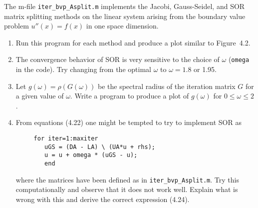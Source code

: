 

The m-file \verb+iter_bvp_Asplit.m+ implements the Jacobi, Gauss-Seidel, and
SOR matrix splitting methods on the linear system arising from the boundary
value problem $u''(x) = f(x)$ in one space dimension.  

\begin{enumerate}
\item Run this program for each method and produce a plot similar to 
Figure~4.2.

\item The convergence behavior of SOR is very sensitive to the choice of
$\omega$ ({\tt omega} in the code).  Try changing from the optimal $\omega$
to $\omega = 1.8$ or 1.95.

\item Let $g(\omega) = \rho(G(\omega))$ be the spectral radius of the
iteration matrix $G$ for a given value of $\omega$.  Write a program to
produce a plot of $g(\omega)$ for $0\leq \omega \leq 2$.

\item From equations (4.22) one might be tempted to try to implement SOR as
\begin{verbatim}
     for iter=1:maxiter
        uGS = (DA - LA) \ (UA*u + rhs);
        u = u + omega * (uGS - u);
        end
\end{verbatim}
where the matrices have been defined as in \verb+iter_bvp_Asplit.m+.
Try this computationally and observe that it does not work well.  Explain
what is wrong with this and derive the correct expression (4.24).

\end{enumerate} 

